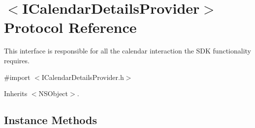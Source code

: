 \hypertarget{protocol_i_calendar_details_provider-p}{}\section{$<$I\+Calendar\+Details\+Provider$>$ Protocol Reference}
\label{protocol_i_calendar_details_provider-p}


This interface is responsible for all the calendar interaction the S\+D\+K functionality requires.  




{\ttfamily \#import $<$I\+Calendar\+Details\+Provider.\+h$>$}



Inherits $<$\+N\+S\+Object$>$.

\subsection*{Instance Methods}
